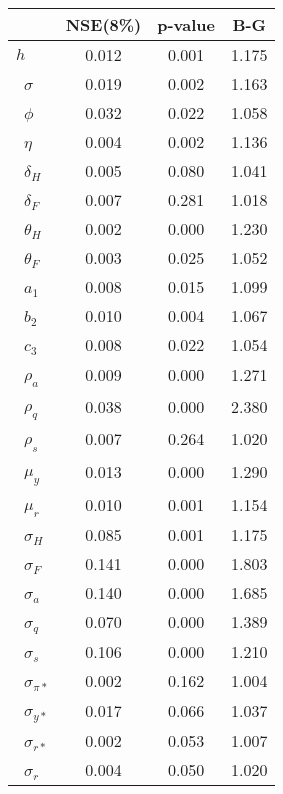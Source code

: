 \begin{tiny}\begin{tabular}{lccc}
\hline
&\textbf{NSE(8\%)}&\textbf{p-value}&\textbf{B-G}\\\hline
\textbf{$ h             $}&0.012&0.001&1.175\\\
\textbf{$ \sigma        $}&0.019&0.002&1.163\\\
\textbf{$ \phi          $}&0.032&0.022&1.058\\\
\textbf{$ \eta          $}&0.004&0.002&1.136\\\
\textbf{$ \delta_{H}    $}&0.005&0.080&1.041\\\
\textbf{$ \delta_{F}    $}&0.007&0.281&1.018\\\
\textbf{$ \theta_{H}    $}&0.002&0.000&1.230\\\
\textbf{$ \theta_{F}    $}&0.003&0.025&1.052\\\
\textbf{$ a_{1}         $}&0.008&0.015&1.099\\\
\textbf{$ b_{2}         $}&0.010&0.004&1.067\\\
\textbf{$ c_{3}         $}&0.008&0.022&1.054\\\
\textbf{$ \rho_{a}      $}&0.009&0.000&1.271\\\
\textbf{$ \rho_{q}      $}&0.038&0.000&2.380\\\
\textbf{$ \rho_{s}      $}&0.007&0.264&1.020\\\
\textbf{$ \mu_{y}       $}&0.013&0.000&1.290\\\
\textbf{$ \mu_{r}       $}&0.010&0.001&1.154\\\
\textbf{$ \sigma_{H}    $}&0.085&0.001&1.175\\\
\textbf{$ \sigma_{F}    $}&0.141&0.000&1.803\\\
\textbf{$ \sigma_{a}    $}&0.140&0.000&1.685\\\
\textbf{$ \sigma_{q}    $}&0.070&0.000&1.389\\\
\textbf{$ \sigma_{s}    $}&0.106&0.000&1.210\\\
\textbf{$ \sigma_{\pi*} $}&0.002&0.162&1.004\\\
\textbf{$ \sigma_{y*}   $}&0.017&0.066&1.037\\\
\textbf{$ \sigma_{r*}   $}&0.002&0.053&1.007\\\
\textbf{$ \sigma_{r}    $}&0.004&0.050&1.020\\\hline
\end{tabular}
\end{tiny}